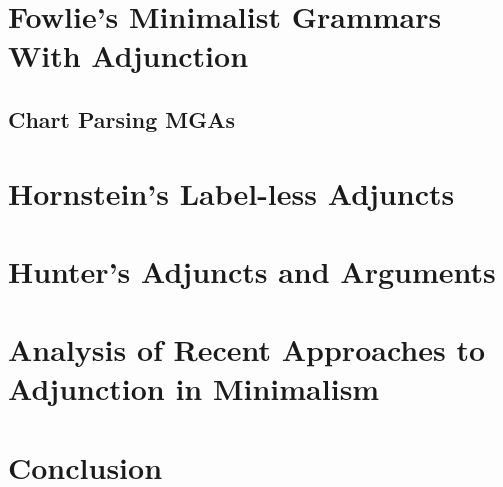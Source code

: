 \documentclass{article}
\begin{document}
\section{Fowlie's Minimalist Grammars With Adjunction}
\label{sec:fowlie-mga}

\subsection{Chart Parsing MGAs}
\label{sec:chart-parsing-mga}

\section{Hornstein's Label-less Adjuncts}
\label{sec:hornstein-adjuncts}

\section{Hunter's Adjuncts and Arguments}
\label{sec:hunter-adjuncts}

\section{Analysis of Recent Approaches to Adjunction in Minimalism}
\label{sec:analysis}

\section{Conclusion}
\label{sec:conclusion}




\cleardoublepage
{}
{}
\nocite{*}


\end{document}
